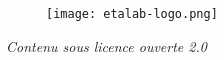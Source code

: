 \begin{titlepage}
\begin{center}
        \begin{figure}[H]
            \centering
            \texttt{[image: etalab-logo.png]}
            \label{traitement}
        \end{figure}
        \begin{small}
    {\textit{Contenu sous licence ouverte 2.0}}
    \end{small}
        
    \end{center}
\end{titlepage}

\thispagestyle{empty}
\cleardoublepage